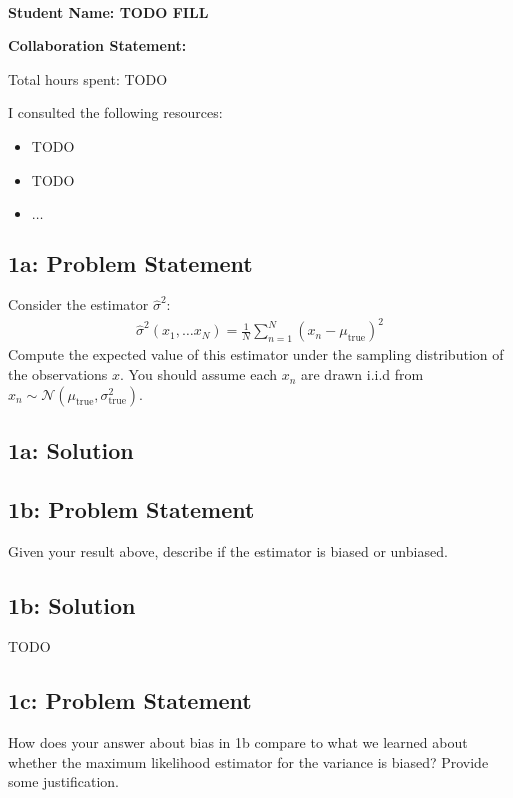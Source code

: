 \documentclass[12pt]{article}
\newcommand{\officialdirections}[1]{{\color{blue} #1}}
\begin{document}
~~\\ %
\Large{\bf Student Name: TODO FILL}

\Large{\bf Collaboration Statement:}

Total hours spent: TODO

I consulted the following resources:
\begin{itemize}
\item TODO
\item TODO
\item $\ldots$	
\end{itemize}

\tableofcontents

\newpage
\officialdirections{
\subsection*{1a: Problem Statement}

Consider the estimator $\hat{\sigma}^2$:
\begin{align}
\hat{\sigma}^2(x_1, \ldots x_N) = \frac{1}{N} \sum_{n=1}^N (x_n - \mu_{\text{true}})^2
\end{align}
Compute the expected value of this estimator under the sampling distribution of the observations $x$. You should assume each $x_n$ are drawn i.i.d from $x_n \sim \mathcal{N}( \mu_{\text{true}}, \sigma^2_{\text{true}})$.  
}

\subsection{1a: Solution}


\newpage
\officialdirections{
\subsection*{1b: Problem Statement}
Given your result above, describe if the estimator is biased or unbiased.
}

\subsection{1b: Solution}

TODO



\officialdirections{
\subsection*{1c: Problem Statement}
How does your answer about bias in 1b compare to what we learned about whether the maximum likelihood estimator for the variance is biased? Provide some justification.
}
\end{document}
